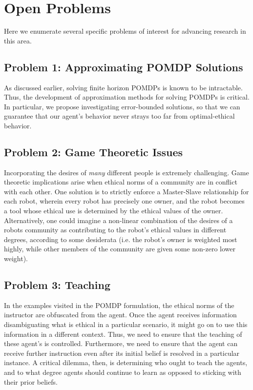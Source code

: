 \documentclass[11pt]{article}
\begin{document}



\section{Open Problems}

Here we enumerate several specific problems of interest for advancing research in this area.

\subsection{Problem 1: Approximating POMDP Solutions}  As discussed earlier, solving finite horizon POMDPs is known to be intractable. Thus, the development of approximation methods for solving POMDPs is critical. In particular, we propose investigating error-bounded solutions, so that we can guarantee that our agent's behavior never strays too far from optimal-ethical behavior.

\subsection{Problem 2: Game Theoretic Issues} Incorporating the desires of {\it many} different people is extremely challenging. Game theoretic implications arise when ethical norms of a community are in conflict with each other. One solution is to strictly enforce a Master-Slave relationship for each robot, wherein every robot has precisely one owner, and the robot becomes a tool whose ethical use is determined by the ethical values of the owner. Alternatively, one could imagine a non-linear combination of the desires of a robots community as contributing to the robot's ethical values in different degrees, according to some desiderata (i.e. the robot's owner is weighted most highly, while other members of the community are given some non-zero lower weight).

\subsection{Problem 3: Teaching} In the examples visited in the POMDP formulation, the ethical norms of the instructor are obfuscated from the agent. Once the agent receives information disambiguating what is ethical in a particular scenario, it might go on to use this information in a different context. Thus, we need to ensure that the teaching of these agent's is controlled. Furthermore, we need to ensure that the agent can receive further instruction even after its initial belief is resolved in a particular instance. A critical dilemma, then, is determining who ought to teach the agents, and to what degree agents should continue to learn as opposed to sticking with their prior beliefs.
\end{document}
